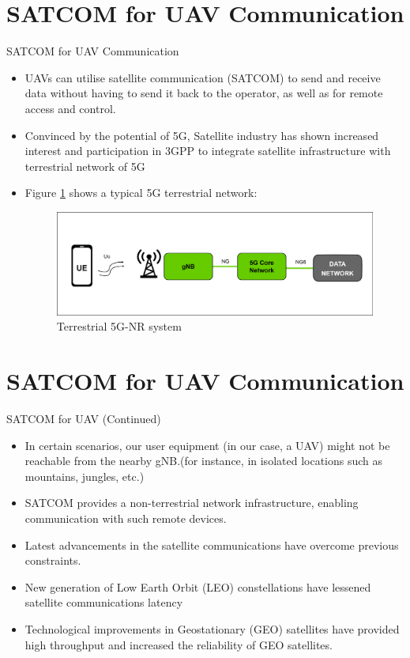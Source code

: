 \documentclass[xcolor=table]{beamer}
\begin{document}
\section{SATCOM for UAV Communication}
\begin{frame}{SATCOM for UAV Communication}
\begin{itemize}
	\item UAVs can utilise satellite communication (SATCOM) to send and receive data without having to send it back to the operator, as well as for remote access and control.
	\item Convinced by the potential of 5G, Satellite industry has shown increased interest and participation in 3GPP to integrate satellite infrastructure with terrestrial network of 5G
	\item Figure \ref{Conventional_5G} shows a typical 5G terrestrial network:
	\begin{figure}[h!]
  		\centering
  		\includegraphics[width=0.9\linewidth]{./figs/Conventional_5G.png}
  		\caption{Terrestrial 5G-NR system}
  		\label{Conventional_5G}
	\end{figure}
\end{itemize}
\end{frame} 

\section{SATCOM for UAV Communication}
\begin{frame}{SATCOM for UAV \small{(Continued})}
\begin{itemize}
	\item In certain scenarios, our user equipment (in our case, a UAV) might not be reachable from the nearby gNB.(for instance, in isolated locations such as mountains, jungles, etc.)
	\item SATCOM provides a non-terrestrial network infrastructure, enabling communication with such
remote devices.
	\item Latest advancements in the satellite communications have overcome previous constraints. 
 \item New generation of Low Earth Orbit (LEO) constellations have lessened satellite communications latency
\item Technological improvements in Geostationary (GEO) satellites have provided high throughput and increased the reliability of GEO satellites.
\end{itemize}
\end{frame} 
\end{document}
